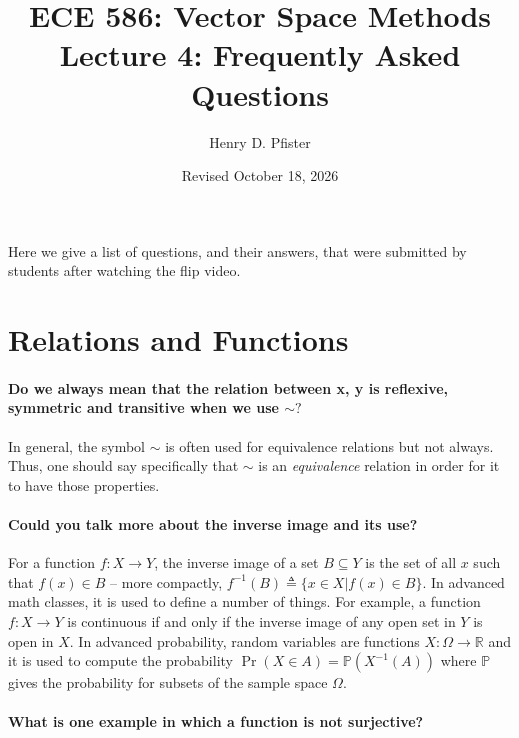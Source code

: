 \documentclass[10pt,english]{article}
\begin{document}
\title{ECE 586: Vector Space Methods \\ Lecture 4: Frequently Asked Questions}
\author{Henry D. Pfister \\ \univ}
\date{Revised October 18, 2026}

\maketitle

Here we give a list of questions, and their answers, that were submitted by students after watching the flip video.

\section{Relations and Functions}

\paragraph{Do we always mean that the relation between x, y is reflexive, symmetric and transitive when we use $\sim?$}

In general, the symbol $\sim$ is often used for equivalence relations but not always.  Thus, one should say specifically that $\sim$ is an \textit{equivalence} relation in order for it to have those properties.

\paragraph{Could you talk more about the inverse image and its use?}
For a function $f: X \rightarrow Y$, the inverse image of a set $B \subseteq Y$ is the set of all $x$ such that $f(x) \in B$ -- more compactly, $f^{-1}(B) \triangleq \{x\in X| f(x) \in B\}$.  In advanced math classes, it is used to define a number of things.  For example, a function $f: X \to Y$ is continuous if and only if the inverse image of any open set in $Y$ is open in $X$.  In advanced probability, random variables are functions $X: \Omega \to \mathbb{R}$ and it is used to compute the probability $\Pr (X \in A) = \mathbb{P}(X^{-1}(A))$ where $\mathbb{P}$ gives the probability for subsets of the sample space $\Omega$.

\paragraph{What is one example in which a function is not surjective?}
\end{document}
